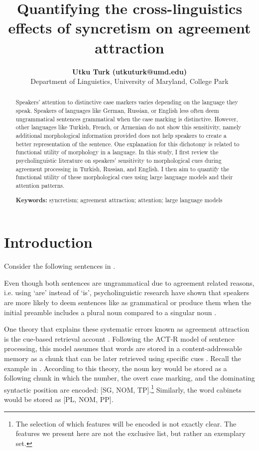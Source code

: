 \documentclass[10pt,letterpaper]{article}
\title{Quantifying the cross-linguistics effects of syncretism on agreement attraction}
\author{{\large \bf Utku Turk (utkuturk@umd.edu)} \\
  Department of Linguistics, University of Maryland, College Park}
\begin{document}
\maketitle


\begin{abstract}
Speakers' attention to distinctive case markers varies depending on the language they speak. Speakers of languages like German, Russian, or English less often deem ungrammatical sentences grammatical when the case marking is distinctive. However, other languages like Turkish, French, or Armenian do not show this sensitivity, namely additional morphological information provided does not help speakers to create a better representation of the sentence. One explanation for this dichotomy is related to functional utility of morphology in a language. In this study, I first review the psycholinguistic literature on speakers' sensitivity to morphological cues during agreement processing in Turkish, Russian, and English. I then aim to quantify the functional utility of these morphological cues using large language models and their attention patterns. 

\textbf{Keywords:} 
syncretism; agreement attraction; attention; large language models
\end{abstract}

\section{Introduction}


Consider the following sentences in \Next{}.\vspace{-0.5em}

\ea 
    \vspace{-0.2em}
    \vspace{-0.5em}
    \z
\z

Even though both sentences are ungrammatical due to agreement related reasons, i.e. using `are' instead of `is', psycholinguistic research have shown that speakers are more likely to deem sentences like  as grammatical or produce them when the initial preamble includes a plural noun compared to a singular noun \cite{WagersEtAl2009}.

One theory that explains these systematic errors known as agreement attraction is the cue-based retrieval account \cite{WagersEtAl2009}. Following the ACT-R model of sentence processing, this model assumes that words are stored in a content-addressable memory as a chunk that can be later retrieved using specific cues \cite{LewisVasishth2005}. Recall the example in . According to this theory, the noun key would be stored as a following chunk in which the number, the overt case marking, and the dominating syntactic position are encoded: [SG, NOM, TP].\footnote{The selection of which features will be encoded is not exactly clear. The features we present here are not the exclusive list, but rather an exemplary set.} Similarly, the word cabinets would be stored as [PL, NOM, PP].
\end{document}
